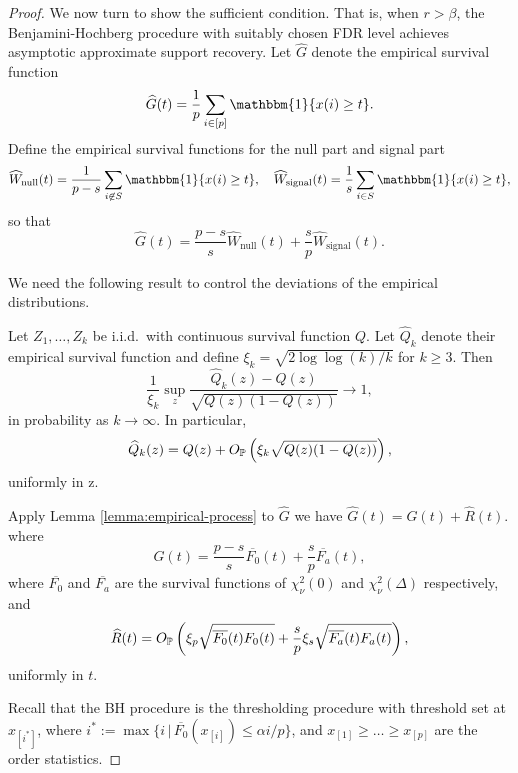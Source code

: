 \begin{proof}
We now turn to show the sufficient condition. 
That is, when $r > \beta$, the Benjamini-Hochberg procedure with suitably chosen FDR level achieves asymptotic approximate support recovery.
Let $\widehat{G}$ denote the empirical survival function
\begin{equation} \label{eq:empirical-survival}
    \widehat{G}(t) = \frac{1}{p}\sum_{i\in[p]}\mathbbm{1}\{x(i) \ge t\}.
\end{equation}
Define the empirical survival functions for the null part and signal part
\begin{equation} \label{eq:empirical-survival-null-signal}
    \widehat{W}_\text{null}(t) = \frac{1}{p-s}\sum_{i\not\in S}\mathbbm{1}\{x(i) \ge t\},
    \quad
    \widehat{W}_\text{signal}(t) = \frac{1}{s}\sum_{i\in S}\mathbbm{1}\{x(i) \ge t\},
\end{equation}
so that
$$
\widehat{G}(t) = \frac{p-s}{s}\widehat{W}_\text{null}(t) + \frac{s}{p}\widehat{W}_\text{signal}(t).
$$

We need the following result to control the deviations of the empirical distributions.
\begin{lemma} \label{lemma:empirical-process}
Let $Z_1,\ldots,Z_k$ be i.i.d.\ with continuous survival function $Q$.
Let $\widehat{Q}_k$ denote their empirical survival function and define 
$\xi_k = \sqrt{2\log{\log{(k)}}/k}$ for $k \ge 3$. 
Then
$$
\frac{1}{\xi_k}\sup_z\frac{\widehat{Q}_k(z) - Q(z)}{\sqrt{Q(z)(1 - Q(z))}} \to 1,
$$
in probability as $k \to \infty$.
In particular,
$$
\widehat{Q}_k(z) = Q(z) + O_\P\left(\xi_k\sqrt{Q(z)(1 - Q(z))}\right),
$$
uniformly in z.
\end{lemma}

Apply Lemma \ref{lemma:empirical-process} to $\widehat{G}$ we have
$\widehat{G}(t) = G(t) + \widehat{R}(t)$.
where 
\begin{equation} \label{eq:empirical-process-mean}
    G(t) = \frac{p-s}{s}\overline{F_0}(t) + \frac{s}{p}\overline{F_a}(t),
\end{equation}
where $\overline{F_0}$ and $\overline{F_a}$ are the survival functions of $\chi_\nu^2(0)$ and $\chi_\nu^2(\Delta)$ respectively, and 
\begin{equation} \label{eq:empirical-process-residual}
    \widehat{R}(t) = O_\P\left(\xi_p\sqrt{\overline{F_0}(t)F_0(t)} + \frac{s}{p}\xi_s\sqrt{\overline{F_a}(t)F_a(t)}\right),
\end{equation}
uniformly in $t$.

Recall that the BH procedure is the thresholding procedure with threshold set at $x_{[i^*]}$, where $i^* := \max\{i\,|\,\overline{F_0}(x_{[i]})\le \alpha i/p\}$, and $x_{[1]}\ge\ldots\ge x_{[p]}$ are the order statistics.


\end{proof}
